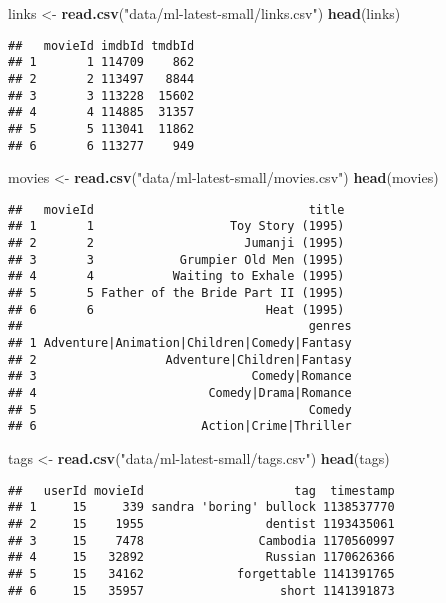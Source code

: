 \documentclass[]{book}
\newenvironment{Shaded}{\begin{snugshade}}{\end{snugshade}}
\newcommand{\KeywordTok}[1]{\textcolor[rgb]{0.13,0.29,0.53}{\textbf{{#1}}}}
\newcommand{\StringTok}[1]{\textcolor[rgb]{0.31,0.60,0.02}{{#1}}}
\newcommand{\NormalTok}[1]{{#1}}
\theoremstyle{definition}
\theoremstyle{definition}
\theoremstyle{definition}
\theoremstyle{remark}
\begin{document}
\begin{Shaded}
\begin{Highlighting}[]
\NormalTok{links <-}\StringTok{ }\KeywordTok{read.csv}\NormalTok{(}\StringTok{"data/ml-latest-small/links.csv"}\NormalTok{)}
\KeywordTok{head}\NormalTok{(links)}
\end{Highlighting}
\end{Shaded}

\begin{verbatim}
##   movieId imdbId tmdbId
## 1       1 114709    862
## 2       2 113497   8844
## 3       3 113228  15602
## 4       4 114885  31357
## 5       5 113041  11862
## 6       6 113277    949
\end{verbatim}

\begin{Shaded}
\begin{Highlighting}[]
\NormalTok{movies <-}\StringTok{ }\KeywordTok{read.csv}\NormalTok{(}\StringTok{"data/ml-latest-small/movies.csv"}\NormalTok{)}
\KeywordTok{head}\NormalTok{(movies)}
\end{Highlighting}
\end{Shaded}

\begin{verbatim}
##   movieId                              title
## 1       1                   Toy Story (1995)
## 2       2                     Jumanji (1995)
## 3       3            Grumpier Old Men (1995)
## 4       4           Waiting to Exhale (1995)
## 5       5 Father of the Bride Part II (1995)
## 6       6                        Heat (1995)
##                                        genres
## 1 Adventure|Animation|Children|Comedy|Fantasy
## 2                  Adventure|Children|Fantasy
## 3                              Comedy|Romance
## 4                        Comedy|Drama|Romance
## 5                                      Comedy
## 6                       Action|Crime|Thriller
\end{verbatim}

\begin{Shaded}
\begin{Highlighting}[]
\NormalTok{tags <-}\StringTok{ }\KeywordTok{read.csv}\NormalTok{(}\StringTok{"data/ml-latest-small/tags.csv"}\NormalTok{)}
\KeywordTok{head}\NormalTok{(tags)}
\end{Highlighting}
\end{Shaded}

\begin{verbatim}
##   userId movieId                     tag  timestamp
## 1     15     339 sandra 'boring' bullock 1138537770
## 2     15    1955                 dentist 1193435061
## 3     15    7478                Cambodia 1170560997
## 4     15   32892                 Russian 1170626366
## 5     15   34162             forgettable 1141391765
## 6     15   35957                   short 1141391873
\end{verbatim}
\end{document}
